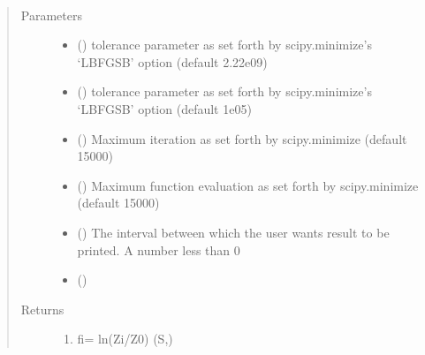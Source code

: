\documentclass[letterpaper,10pt,english]{sphinxmanual}
\begin{document}
\begin{fulllineitems}
\begin{fulllineitems}
\label{\detokenize{wham:wham.Bwham.Bwham.Maximum_likelihood}}~\begin{quote}\begin{description}
\item[{Parameters}] \leavevmode\begin{itemize}
\item {} 
 () \textendash{} tolerance parameter as set forth by scipy.minimize’s ‘L\sphinxhyphen{}BFGS\sphinxhyphen{}B’ option (default 2.22e\sphinxhyphen{}09)

\item {} 
 () \textendash{} tolerance parameter as set forth by scipy.minimize’s ‘L\sphinxhyphen{}BFGS\sphinxhyphen{}B’ option (default 1e\sphinxhyphen{}05)

\item {} 
 () \textendash{} Maximum iteration as set forth by scipy.minimize (default 15000)

\item {} 
 () \textendash{} Maximum function evaluation as set forth by scipy.minimize (default 15000)

\item {} 
 () \textendash{} The interval between which the user wants result to be printed. A number less than 0

\item {} 
 () \textendash{} 

\end{itemize}

\item[{Returns}] \leavevmode
\begin{enumerate}
%
\item {} 
fi= \sphinxhyphen{}ln(Zi/Z0) (S,)


\end{enumerate}
\end{description}
\end{quote}
\end{fulllineitems}
\end{fulllineitems}
\end{document}
